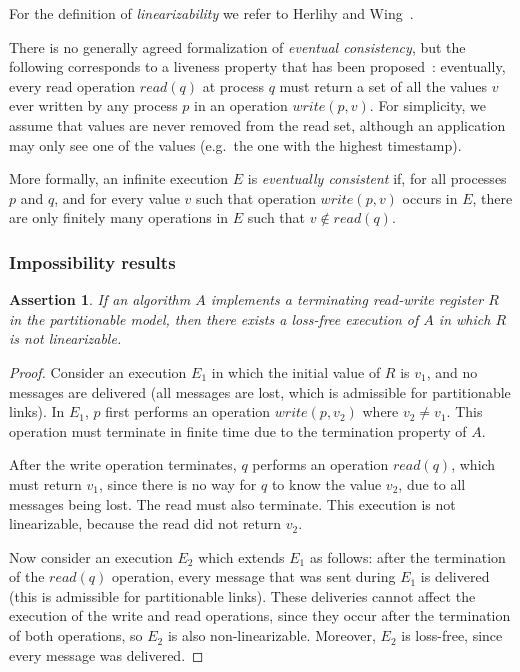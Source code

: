 \documentclass[a4paper,twocolumn,10pt]{article}
\newtheorem{theorem}{Assertion}
\begin{document}
For the definition of \emph{linearizability} we refer to Herlihy and Wing~\cite{Herlihy1990jq}.

There is no generally agreed formalization of \emph{eventual consistency}, but the following
corresponds to a liveness property that has been proposed~\cite{Bailis2013jc, Attiya2015dm}:
eventually, every read operation $\mathit{read}(q)$ at process $q$ must return a set of all the
values $v$ ever written by any process $p$ in an operation $\mathit{write}(p, v)$. For simplicity,
we assume that values are never removed from the read set, although an application may only see one
of the values (e.g.\ the one with the highest timestamp).

More formally, an infinite execution $E$ is \emph{eventually consistent} if, for all processes $p$
and $q$, and for every value $v$ such that operation $\mathit{write}(p, v)$ occurs in $E$, there are
only finitely many operations in $E$ such that $v \notin \mathit{read}(q)$.

\subsubsection{Impossibility results}\label{sec:impossibility}

\begin{theorem}\label{th:1}
If an algorithm $A$ implements a terminating read-write register $R$ in the partitionable model,
then there exists a loss-free execution of $A$ in which $R$ is not linearizable.
\end{theorem}

\begin{proof}
Consider an execution $E_1$ in which the initial value of $R$ is $v_1$, and no messages are
delivered (all messages are lost, which is admissible for partitionable links). In $E_1$, $p$ first
performs an operation $\mathit{write}(p, v_2)$ where $v_2 \neq v_1$. This operation must terminate
in finite time due to the termination property of $A$.

After the write operation terminates, $q$ performs an operation $\mathit{read}(q)$, which must
return $v_1$, since there is no way for $q$ to know the value $v_2$, due to all messages being lost.
The read must also terminate. This execution is not linearizable, because the read did not return
$v_2$.

Now consider an execution $E_2$ which extends $E_1$ as follows: after the termination of the
$\mathit{read}(q)$ operation, every message that was sent during $E_1$ is delivered (this is
admissible for partitionable links). These deliveries cannot affect the execution of the write and
read operations, since they occur after the termination of both operations, so $E_2$ is also
non-linearizable. Moreover, $E_2$ is loss-free, since every message was delivered.
\end{proof}
\end{document}
